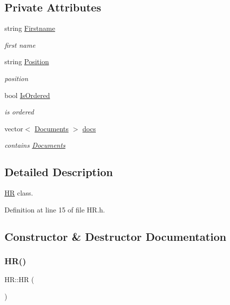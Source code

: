 \subsection*{Private Attributes}
\begin{DoxyCompactItemize}
\item 
string \hyperlink{class_h_r_a9d6a324bfb9253c23e71eefeb8bacde2}{Firstname}
\begin{DoxyCompactList}\small\item\em first name \end{DoxyCompactList}\item 
string \hyperlink{class_h_r_aa19b0e239c73c6f5ab18801f102f1c2e}{Position}
\begin{DoxyCompactList}\small\item\em position \end{DoxyCompactList}\item 
bool \hyperlink{class_h_r_a9afdecc986cdc4e15a8d73b30286dbdc}{Is\+Ordered}
\begin{DoxyCompactList}\small\item\em is ordered \end{DoxyCompactList}\item 
vector$<$ \hyperlink{class_documents}{Documents} $>$ \hyperlink{class_h_r_a3dca2f7facc0c01c245af8a1a1994f37}{docs}
\begin{DoxyCompactList}\small\item\em contains \hyperlink{class_documents}{Documents} \end{DoxyCompactList}\end{DoxyCompactItemize}


\subsection{Detailed Description}
\hyperlink{class_h_r}{HR} class. 

Definition at line 15 of file H\+R.\+h.



\subsection{Constructor \& Destructor Documentation}
\mbox{\label{class_h_r_a0cb187ef9d2c057d44e9bfcb679eed27}} 
\subsubsection{\texorpdfstring{H\+R()}{HR()}}
{\footnotesize\ttfamily H\+R\+::\+HR (\begin{DoxyParamCaption}{ }\end{DoxyParamCaption})}



